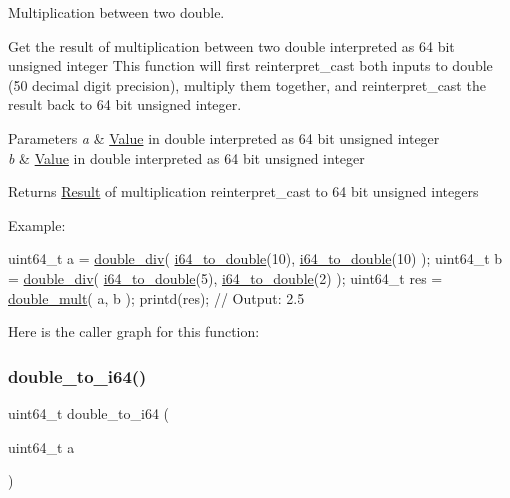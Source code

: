 Multiplication between two double. 

Get the result of multiplication between two double interpreted as 64 bit unsigned integer This function will first reinterpret\+\_\+cast both inputs to double (50 decimal digit precision), multiply them together, and reinterpret\+\_\+cast the result back to 64 bit unsigned integer. 
\begin{DoxyParams}{Parameters}
{\em a} & \mbox{\hyperlink{struct_value}{Value}} in double interpreted as 64 bit unsigned integer \\
\hline
{\em b} & \mbox{\hyperlink{struct_value}{Value}} in double interpreted as 64 bit unsigned integer \\
\hline
\end{DoxyParams}
\begin{DoxyReturn}{Returns}
\mbox{\hyperlink{struct_result}{Result}} of multiplication reinterpret\+\_\+cast to 64 bit unsigned integers
\end{DoxyReturn}
Example\+: 
\begin{DoxyCode}
uint64\_t a = \mbox{\hyperlink{group__mathcapi_gad67af06a6b0e9dbbf3be05d6bf99257c}{double\_div}}( \mbox{\hyperlink{group__mathcapi_gaec506d4ee77526e67ab5f2a8ef54f2b5}{i64\_to\_double}}(10), \mbox{\hyperlink{group__mathcapi_gaec506d4ee77526e67ab5f2a8ef54f2b5}{i64\_to\_double}}(10) );
uint64\_t b = \mbox{\hyperlink{group__mathcapi_gad67af06a6b0e9dbbf3be05d6bf99257c}{double\_div}}( \mbox{\hyperlink{group__mathcapi_gaec506d4ee77526e67ab5f2a8ef54f2b5}{i64\_to\_double}}(5), \mbox{\hyperlink{group__mathcapi_gaec506d4ee77526e67ab5f2a8ef54f2b5}{i64\_to\_double}}(2) );
uint64\_t res = \mbox{\hyperlink{group__mathcapi_ga6390d36d23bd89bcd9bcf52385ba88f2}{double\_mult}}( a, b );
printd(res); \textcolor{comment}{// Output: 2.5}
\end{DoxyCode}
 Here is the caller graph for this function\+:
\mbox{\label{group__mathcapi_ga1388e46084036133e57508c18590b1ed}} 
\subsubsection{\texorpdfstring{double\+\_\+to\+\_\+i64()}{double\_to\_i64()}}
{\footnotesize\ttfamily uint64\+\_\+t double\+\_\+to\+\_\+i64 (\begin{DoxyParamCaption}\item[{uint64\+\_\+t}]{a }\end{DoxyParamCaption})}



